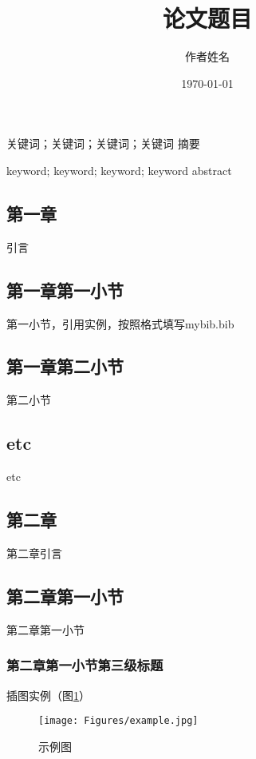 \documentclass[twoside]{CUGThesis}
\title{论文题目} %
\author{作者姓名} %
\date{\today} %
\begin{document}
	\maketitle
	\makestatement
	
	\begin{cnabstract}{关键词；关键词；关键词；关键词}
		摘要
	\end{cnabstract}
	
	\begin{enabstract}{keyword; keyword; keyword; keyword}
		abstract
	\end{enabstract}
	
	\makeToc
	
	
	\begin{spacing}{2}
		\section{第一章}
	\end{spacing}
	引言
	\subsection{第一章第一小节}
	第一小节，引用实例\cite{引用}，按照格式填写mybib.bib
	\subsection{第一章第二小节}
	第二小节
	\subsection{etc}
	etc
	
	
	\begin{spacing}{2}
		\section{第二章}
	\end{spacing}
	第二章引言
	\subsection{第二章第一小节}
	第二章第一小节
	\subsubsection{第二章第一小节第三级标题}
	插图实例（图\ref{Fig:example}）
	\begin{figure}[!t]
		\centering
		\texttt{[image: Figures/example.jpg]}
		\caption{示例图}
		\label{Fig:example}
	\end{figure}
	
\end{document}
